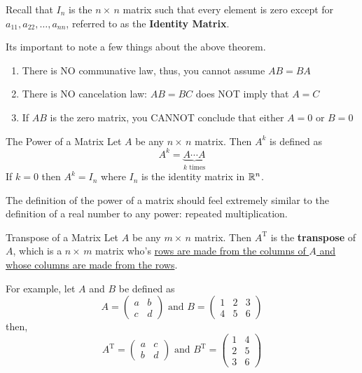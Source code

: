 Recall that $I_n$ is the $n\times\,n$ matrix such that every element is zero except for $a_{11}, a_{22}, \dots, a_{nn}$, referred to as the \textbf{Identity Matrix}. 

Its important to note a few things about the above theorem. 
\begin{enumerate}
    \item There is NO communative law, thus, you cannot assume $AB = BA$
    \item There is NO cancelation law: $AB=BC$ does NOT imply that $A=C$
    \item If $AB$ is the zero matrix, you CANNOT conclude that either $A=0$ or $B=0$ 
\end{enumerate}

\begin{defbox}{The Power of a Matrix}{}
    Let $A$ be any $n\times\,n$ matrix. Then $A^{k}$ is defined as 
    \[
        A^{k} = \underbrace{A \cdots A}_{k \text{ times}}
    \]
    If $k=0$ then $A^{k}=I_n$ where $I_n$ is the identity matrix in $\mathbb R^{n}$. 
\end{defbox}
The definition of the power of a matrix should feel extremely similar to the definition of a real number to any power: repeated multiplication. 

\begin{defbox}{Transpose of a Matrix}{}
    Let $A$ be any $m\times\,n$ matrix. Then $A^{\text{T}}$ is the \textbf{transpose} of $A$, which is a $n \times\, m$ matrix who's \underline{rows are made from the columns of $A$ and whose columns are made from the rows}. 
\end{defbox}

For example, let $A$ and $B$ be defined as 
\[
    A = \begin{pmatrix}
        a & b \\ c & d
    \end{pmatrix}
    \text{ and }
    B = \begin{pmatrix}
        1 & 2 & 3 \\ 4 & 5 & 6
    \end{pmatrix}
\]
then, 
\[
    A^{\text{T}} = \begin{pmatrix}
        a & c \\ b & d
    \end{pmatrix}
    \text{ and }
    B^{\text{T}} = \begin{pmatrix}
        1 & 4 \\
        2 & 5 \\
        3 & 6
    \end{pmatrix}
\]

